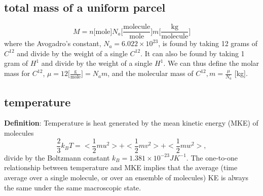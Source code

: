 \setlength\parindent{0pt} %
\subsection{total mass of a uniform parcel}
\begin{equation}
   M = n \big[\text{mole}\big] N_a \big[\frac{\text{molecule}}{\text{mole}}\big] m
       \big[\frac{\text{kg}}{\text{molecule}}\big]
\end{equation}
where the Avogadro's constant, $N_a = 6.022\times10^{23}$, is found by taking 12 grams of
$C^{12}$ and divide by the weight of a single $C^{12}$. It can also be found by taking 1 gram of 
$H^{1}$ and divide by the weight of a single $H^{1}$. We can thus define the molar mass for
$C^{12}$, $\mu = 12 \big[\frac{\text{g}}{\text{mole}}\big] = N_a m$, and the molecular mass of
$C^{12}, m = \frac{\mu}{N_a}$ [kg]. 

\subsection{temperature}
{\bf Definition}: Temperature is heat generated by the mean kinetic energy (MKE) of molecules
\begin{equation}
   \frac{2}{3} k_B T = <\frac{1}{2} m u^2> + <\frac{1}{2} m v^2> + <\frac{1}{2} m w^2>,
\end{equation}
divide by the Boltzmann constant $k_B = 1.381 \times 10^{-23} J K^{-1}$. The one-to-one relationship
between temperature and MKE implies that the average (time average over a single molecule, or over
an ensemble of molecules) KE is always the same under the same macroscopic state.


